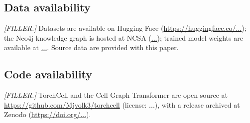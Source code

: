 \subsection*{Data availability}
\textit{[FILLER.]} Datasets are available on Hugging Face
(\url{https://huggingface.co/...}); the Neo4j knowledge graph is hosted at NCSA
(\url{...}); trained model weights are available at \url{...}. Source data are provided
with this paper.

\subsection*{Code availability}
\textit{[FILLER.]} TorchCell and the Cell Graph Transformer are open source at
\url{https://github.com/Mjvolk3/torchcell} (license: ...), with a release archived at
Zenodo (\url{https://doi.org/...}).
